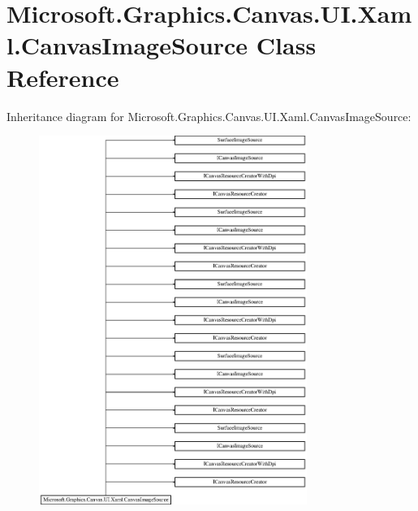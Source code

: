 \hypertarget{class_microsoft_1_1_graphics_1_1_canvas_1_1_u_i_1_1_xaml_1_1_canvas_image_source}{}\section{Microsoft.\+Graphics.\+Canvas.\+U\+I.\+Xaml.\+Canvas\+Image\+Source Class Reference}
\label{class_microsoft_1_1_graphics_1_1_canvas_1_1_u_i_1_1_xaml_1_1_canvas_image_source}
Inheritance diagram for Microsoft.\+Graphics.\+Canvas.\+U\+I.\+Xaml.\+Canvas\+Image\+Source\+:\begin{figure}[H]
\begin{center}
\leavevmode
\includegraphics[height=12.000000cm]{class_microsoft_1_1_graphics_1_1_canvas_1_1_u_i_1_1_xaml_1_1_canvas_image_source}
\end{center}
\end{figure}
